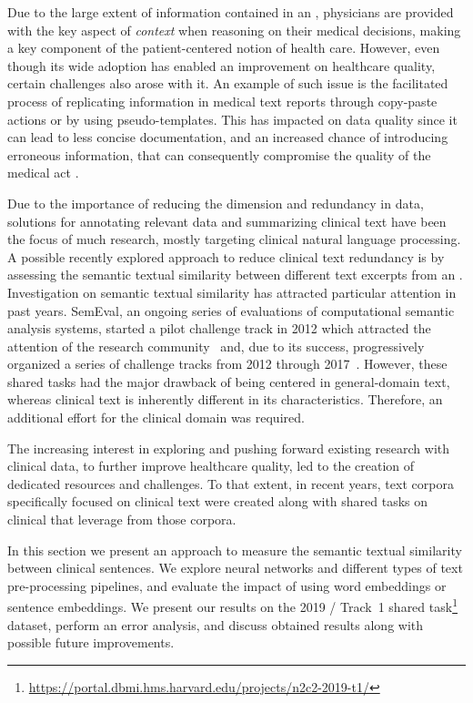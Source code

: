Due to the large extent of information contained in an , physicians are provided with the key aspect of \textit{context} when reasoning on their medical decisions, making  a key component of the patient-centered notion of health care.
However, even though its wide adoption has enabled an improvement on healthcare quality, certain challenges also arose with it.
An example of such issue is the facilitated process of replicating information in medical text reports through copy-paste actions or by using pseudo-templates.
This has impacted on  data quality since it can lead to less concise documentation, and an increased chance of introducing erroneous information, that can consequently compromise the quality of the medical act \parencite{cohen2013a,singh2013a}.

Due to the importance of reducing the dimension and redundancy in  data, solutions for annotating relevant data and summarizing clinical text \parencite{pivovarov2015a} have been the focus of much research, mostly targeting clinical natural language processing.
A possible recently explored approach to reduce clinical text redundancy is by assessing the semantic textual similarity between different text excerpts from an .
Investigation on semantic textual similarity has attracted particular attention in past years.
SemEval, an ongoing series of evaluations of computational semantic analysis systems, started a pilot  challenge track in 2012 which attracted the attention of the research community~\parencite{agirre2012a} and, due to its success, progressively organized a series of  challenge tracks from 2012 through 2017~\parencite{agirre2013a,agirre2014b,agirre2015a,agirre2016a,cer2017a}.
However, these shared tasks had the major drawback of being centered in general-domain text, whereas clinical text is inherently different in its characteristics.
Therefore, an additional effort for the clinical domain was required.

The increasing interest in exploring and pushing forward existing research with clinical data, to further improve healthcare quality, led to the creation of dedicated resources and challenges. To that extent, in recent years, text corpora specifically focused on clinical text were created along with shared tasks on clinical  that leverage from those corpora.

In this section we present an approach to measure the semantic textual similarity between clinical sentences.
We explore neural networks and different types of text pre-processing pipelines, and evaluate the impact of using word embeddings or sentence embeddings.
We present our results on the 2019 / Track~1 shared task\footnote{\url{https://portal.dbmi.hms.harvard.edu/projects/n2c2-2019-t1/}} dataset, perform an error analysis, and discuss obtained results along with possible future improvements.


